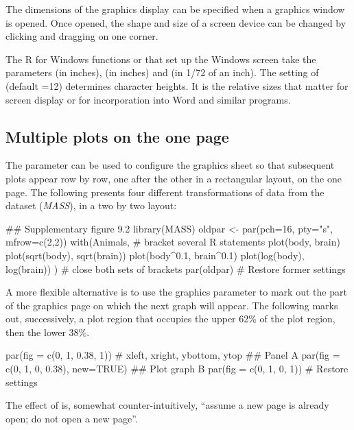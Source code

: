 The dimensions of the graphics display can be specified when a
graphics window is opened.  Once opened, the shape and size of a
screen device can be changed by clicking and dragging on one corner.

The R for Windows functions  or  that
set up the Windows screen take the parameters  (in
inches),  (in inches) and  (in 1/72 of an
inch). The setting of  (default =12) determines
character heights. It is the relative sizes that matter for screen
display or for incorporation into Word and similar programs.

\subsection{Multiple plots on the one page}\label{ss:xplots}
The parameter  can be used to configure the graphics
sheet so that subsequent plots appear row by row, one after the
other in a rectangular layout, on the one page. The following
presents four different transformations of data from the dataset
 ({\em MASS}),
in a two by two layout:
\begin{Schunk}
\begin{Sinput}
## Supplementary figure 9.2
library(MASS)
oldpar <- par(pch=16, pty="s", mfrow=c(2,2))
with(Animals, {      # bracket several R statements
  plot(body, brain)
  plot(sqrt(body), sqrt(brain))
  plot(body^0.1, brain^0.1)
  plot(log(body), log(brain))
})                   # close both sets of brackets
par(oldpar)          # Restore former settings
\end{Sinput}
\end{Schunk}

A more flexible alternative is to use the graphics parameter
 to mark out the part of the graphics page on which the
next graph will appear.  The following marks out, successively,
a plot region that occupies the upper 62\% of the plot region,
then the lower 38\%.
\begin{Schunk}
\begin{Sinput}
par(fig = c(0, 1, 0.38, 1))
          # xleft, xright, ybottom, ytop
## Panel A
par(fig = c(0, 1, 0, 0.38), new=TRUE)
## Plot graph B
par(fig = c(0, 1, 0, 1))    # Restore settings
\end{Sinput}
\end{Schunk}
The effect of  is, somewhat
counter-intuitively, ``assume a new page is already open; do not open
a new page''.

